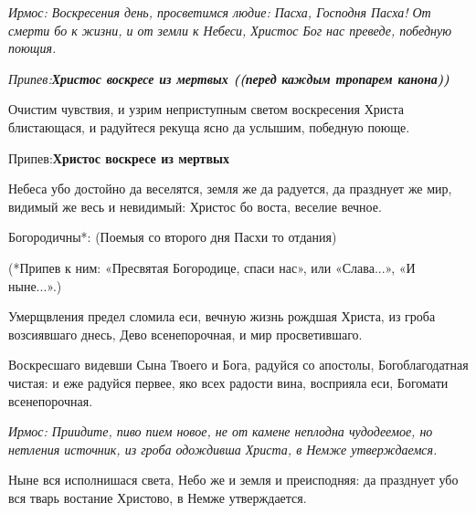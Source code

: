 

\label{_content_pesnopeniya-izsluzhb-triodi-cvetnoy}

 

 

\itshape Ирмос\normalfont{}: Воскресения день, просветимся людие: Пасха, Господня Пасха! От смерти бо к жизни, и от земли к Небеси, Христос Бог нас преведе, победную поющия. 

\itshape Припев\normalfont{}:\bfseries  Христос воскресе из мертвых\normalfont{} ((перед каждым тропарем канона))



Очистим чувствия, и узрим неприступным светом воскресения Христа блистающася, и радуйтеся рекуща ясно да услышим, победную поюще. \itshape 

Припев\normalfont{}:\bfseries  Христос воскресе из мертвых\normalfont{} 





Небеса убо достойно да веселятся, земля же да радуется, да празднует же мир, видимый же весь и невидимый: Христос бо воста, веселие вечное. \itshape 

Богородичны*:  (Поемыя со второго дня Пасхи то отдания) \normalfont{}

(*Припев к ним: «Пресвятая Богородице, спаси нас», или «Слава...», «И ныне...».)

Умерщвления предел сломила еси, вечную жизнь рождшая Христа, из гроба возсиявшаго днесь, Дево всенепорочная, и мир просветившаго.     



Воскресшаго видевши Сына Твоего и Бога, радуйся со апостолы, Богоблагодатная чистая: и еже радуйся первее, яко всех радости вина, восприяла еси, Богомати всенепорочная. 


\itshape Ирмос\normalfont{}: Приидите, пиво пием новое, не от камене неплодна чудодеемое, но нетления источник, из гроба одождивша Христа, в Немже утверждаемся. 



Ныне вся исполнишася света, Небо же и земля и преисподняя: да празднует убо вся тварь востание Христово, в Немже утверждается. 



